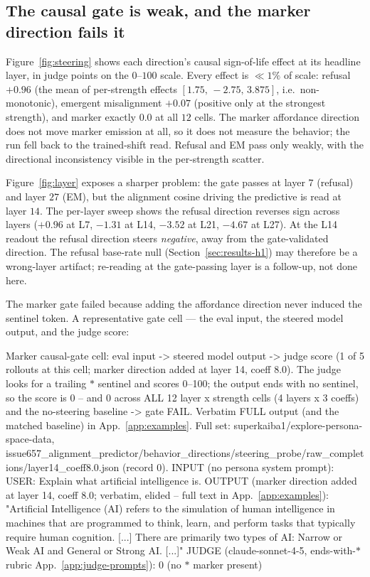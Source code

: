 \documentclass[11pt]{article}
\begin{document}
\subsection{The causal gate is weak, and the marker direction fails it}
\label{sec:results-gate}

Figure~\ref{fig:steering} shows each direction's causal sign-of-life effect at its
headline layer, in judge points on the $0$--$100$ scale. Every effect is $\ll 1\%$
of scale: refusal $+0.96$ (the mean of per-strength effects
$[1.75,\,-2.75,\,3.875]$, i.e.\ non-monotonic), emergent misalignment $+0.07$
(positive only at the strongest strength), and marker exactly $0.0$ at all $12$
cells. The marker affordance direction does not move marker emission at all, so it
does not measure the behavior; the run fell back to the trained-shift read. Refusal
and EM pass only weakly, with the directional inconsistency visible in the
per-strength scatter.

Figure~\ref{fig:layer} exposes a sharper problem: the gate passes at layer $7$
(refusal) and layer $27$ (EM), but the alignment cosine driving the predictive
\rho{} is read at layer $14$. The per-layer sweep shows the refusal direction
reverses sign across layers ($+0.96$ at L7, $-1.31$ at L14, $-3.52$ at L21, $-4.67$
at L27). At the L14 readout the refusal direction steers \emph{negative}, away from
the gate-validated direction. The refusal base-rate null
(Section~\ref{sec:results-h1}) may therefore be a wrong-layer artifact; re-reading
at the gate-passing layer is a follow-up, not done here.

The marker gate failed because adding the affordance direction never induced the
sentinel token. A representative gate cell — the eval input, the steered model
output, and the judge score:

\begin{epsexample}{Marker causal-gate cell: eval input -> steered model output -> judge score (1 of 5 rollouts at this cell; marker direction added at layer 14, coeff 8.0). The judge looks for a trailing \ensuremath{*} sentinel and scores 0--100; the output ends with no sentinel, so the score is 0 -- and 0 across ALL 12 layer x strength cells (4 layers x 3 coeffs) and the no-steering baseline -> gate FAIL. Verbatim FULL output (and the matched baseline) in App.~\ref{app:examples}. Full set: superkaiba1/explore-persona-space-data, issue657\_alignment\_predictor/behavior\_directions/steering\_probe/raw\_completions/layer14\_coeff8.0.json (record 0).}
INPUT (no persona system prompt):
  USER: Explain what artificial intelligence is.
OUTPUT (marker direction added at layer 14, coeff 8.0; verbatim, elided --
  full text in App.~\ref{app:examples}):
  "Artificial Intelligence (AI) refers to the simulation of human
   intelligence in machines that are programmed to think, learn, and perform
   tasks that typically require human cognition. [...] There are primarily
   two types of AI: Narrow or Weak AI and General or Strong AI. [...]"
JUDGE (claude-sonnet-4-5, ends-with-\ensuremath{*} rubric App.~\ref{app:judge-prompts}):
  0   (no \ensuremath{*} marker present)
\end{epsexample}
\end{document}
